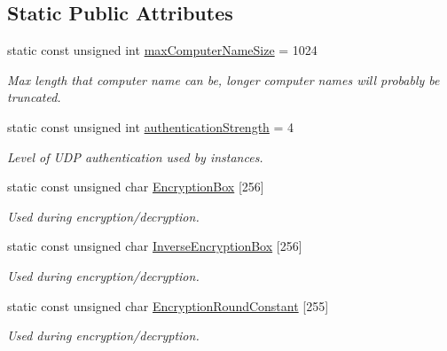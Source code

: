 \subsection*{Static Public Attributes}
\begin{DoxyCompactItemize}
\item 
\hypertarget{class_net_utility_a23f4db25747a22a073fa597478e213e9}{
static const unsigned int \hyperlink{class_net_utility_a23f4db25747a22a073fa597478e213e9}{maxComputerNameSize} = 1024}
\label{class_net_utility_a23f4db25747a22a073fa597478e213e9}

\begin{DoxyCompactList}\small\item\em Max length that computer name can be, longer computer names will probably be truncated. \item\end{DoxyCompactList}\item 
\hypertarget{class_net_utility_a0cd69698eb7cf26f31f71848699e7fd7}{
static const unsigned int \hyperlink{class_net_utility_a0cd69698eb7cf26f31f71848699e7fd7}{authenticationStrength} = 4}
\label{class_net_utility_a0cd69698eb7cf26f31f71848699e7fd7}

\begin{DoxyCompactList}\small\item\em Level of UDP authentication used by instances. \item\end{DoxyCompactList}\item 
static const unsigned char \hyperlink{class_net_utility_a4c0093017521d888c4510cc940ffa335}{EncryptionBox} \mbox{[}256\mbox{]}
\begin{DoxyCompactList}\small\item\em Used during encryption/decryption. \item\end{DoxyCompactList}\item 
static const unsigned char \hyperlink{class_net_utility_af110cf0b6c348c10e3ab60454df79a84}{InverseEncryptionBox} \mbox{[}256\mbox{]}
\begin{DoxyCompactList}\small\item\em Used during encryption/decryption. \item\end{DoxyCompactList}\item 
static const unsigned char \hyperlink{class_net_utility_ab7bcf3b3ff54908eb12a3592e2c529e9}{EncryptionRoundConstant} \mbox{[}255\mbox{]}
\begin{DoxyCompactList}\small\item\em Used during encryption/decryption. \item\end{DoxyCompactList}\end{DoxyCompactItemize}

